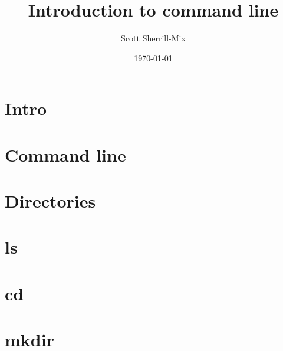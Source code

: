 \documentclass[xcolor=table]{beamer}
\title{\LARGE Introduction to command line}%
\author{\vspace{-.2in}Scott Sherrill-Mix\vspace{-.4in}}
\date{\today\vspace{-.5in}}
\begin{document}
{
\frame[plain]{\vspace{-.3in}\titlepage}
}

\section{Intro}
\section{Command line}
\section{Directories}
\section{ls}
\section{cd}
\section{mkdir}


\end{document}
